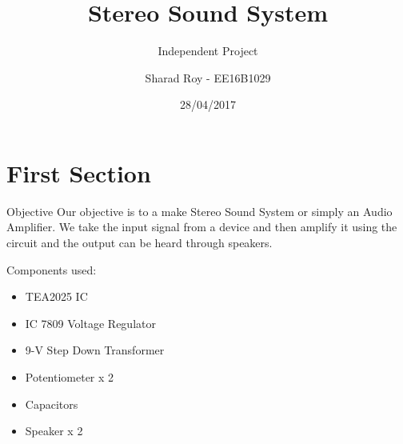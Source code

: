 \documentclass{beamer}
\title{Stereo Sound System}
\subtitle{Independent Project}
\author{Sharad Roy - EE16B1029}
\institute[IIT Bhilai] 
{Department of Electrical Engineering \\
 Indian Institute of Technology Bhilai}
\date{28/04/2017}
\begin{document}
\begin{frame}
  \titlepage
\end{frame}

\section*{First Section}
\begin{frame}{Objective}
Our objective is to a make Stereo Sound System or simply an Audio Amplifier. We take the input signal from a device and then amplify it using the circuit and the output can be heard through speakers. 
\begin{block}{Components used:}

\begin{itemize}
    \item TEA2025 IC
    \item IC 7809 Voltage Regulator
    \item 9-V Step Down Transformer
    \item Potentiometer x 2
    \item Capacitors
    \item Speaker x 2
    
\end{itemize}
\end{block}
\end{frame}
\end{document}
